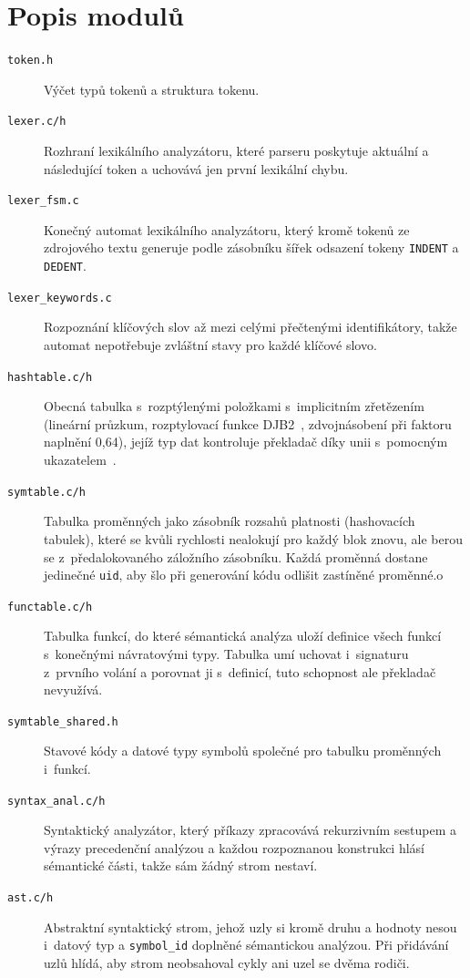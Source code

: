 \documentclass[a4paper,11pt]{article}
\begin{document}
\section{Popis modulů}
 
\begin{description}
    \item[\texttt{token.h}] Výčet typů tokenů a struktura tokenu.
    \item[\texttt{lexer.c/h}] Rozhraní lexikálního analyzátoru, které parseru poskytuje aktuální a následující token a uchovává jen první lexikální chybu.
    \item[\texttt{lexer\_fsm.c}] Konečný automat lexikálního analyzátoru, který kromě tokenů ze zdrojového textu generuje podle zásobníku šířek odsazení tokeny \texttt{INDENT} a \texttt{DEDENT}.
    \item[\texttt{lexer\_keywords.c}] Rozpoznání klíčových slov až mezi celými přečtenými identifikátory, takže automat nepotřebuje zvláštní stavy pro každé klíčové slovo.
    \item[\texttt{hashtable.c/h}] Obecná tabulka s~rozptýlenými položkami s~implicitním zřetězením (lineární průzkum, rozptylovací funkce DJB2~\cite{djb2}, zdvojnásobení při faktoru naplnění 0,64), jejíž typ dat kontroluje překladač díky unii s~pomocným ukazatelem~\cite{hooper}.
    \item[\texttt{symtable.c/h}] Tabulka proměnných jako zásobník rozsahů platnosti (hashovacích tabulek), které se kvůli rychlosti nealokují pro každý blok znovu, ale berou se z~předalokovaného záložního zásobníku. Každá proměnná dostane jedinečné \texttt{uid}, aby šlo při generování kódu odlišit zastíněné proměnné.o
    \item[\texttt{functable.c/h}] Tabulka funkcí, do které sémantická analýza uloží definice všech funkcí s~konečnými návratovými typy. Tabulka umí uchovat i~signaturu z~prvního volání a porovnat ji s~definicí, tuto schopnost ale překladač nevyužívá.
    \item[\texttt{symtable\_shared.h}] Stavové kódy a datové typy symbolů společné pro tabulku proměnných i~funkcí.
    \item[\texttt{syntax\_anal.c/h}] Syntaktický analyzátor, který příkazy zpracovává rekurzivním
    sestupem a výrazy precedenční analýzou a každou rozpoznanou konstrukci hlásí sémantické části, takže sám žádný strom nestaví.
    \item[\texttt{ast.c/h}] Abstraktní syntaktický strom, jehož uzly si kromě druhu a hodnoty nesou i~datový typ a \texttt{symbol\_id} doplněné sémantickou analýzou. Při přidávání uzlů hlídá, aby strom neobsahoval cykly ani uzel se dvěma rodiči.

\end{description}
\end{document}
